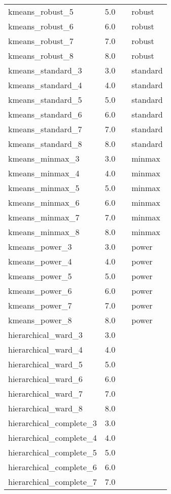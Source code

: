 \begin{tabular}{llll}
kmeans\_robust\_5 & 5.0 &  & robust \\ 
kmeans\_robust\_6 & 6.0 &  & robust \\ 
kmeans\_robust\_7 & 7.0 &  & robust \\ 
kmeans\_robust\_8 & 8.0 &  & robust \\ 
kmeans\_standard\_3 & 3.0 &  & standard \\ 
kmeans\_standard\_4 & 4.0 &  & standard \\ 
kmeans\_standard\_5 & 5.0 &  & standard \\ 
kmeans\_standard\_6 & 6.0 &  & standard \\ 
kmeans\_standard\_7 & 7.0 &  & standard \\ 
kmeans\_standard\_8 & 8.0 &  & standard \\ 
kmeans\_minmax\_3 & 3.0 &  & minmax \\ 
kmeans\_minmax\_4 & 4.0 &  & minmax \\ 
kmeans\_minmax\_5 & 5.0 &  & minmax \\ 
kmeans\_minmax\_6 & 6.0 &  & minmax \\ 
kmeans\_minmax\_7 & 7.0 &  & minmax \\ 
kmeans\_minmax\_8 & 8.0 &  & minmax \\ 
kmeans\_power\_3 & 3.0 &  & power \\ 
kmeans\_power\_4 & 4.0 &  & power \\ 
kmeans\_power\_5 & 5.0 &  & power \\ 
kmeans\_power\_6 & 6.0 &  & power \\ 
kmeans\_power\_7 & 7.0 &  & power \\ 
kmeans\_power\_8 & 8.0 &  & power \\ 
hierarchical\_ward\_3 & 3.0 &  &  \\ 
hierarchical\_ward\_4 & 4.0 &  &  \\ 
hierarchical\_ward\_5 & 5.0 &  &  \\ 
hierarchical\_ward\_6 & 6.0 &  &  \\ 
hierarchical\_ward\_7 & 7.0 &  &  \\ 
hierarchical\_ward\_8 & 8.0 &  &  \\ 
hierarchical\_complete\_3 & 3.0 &  &  \\ 
hierarchical\_complete\_4 & 4.0 &  &  \\ 
hierarchical\_complete\_5 & 5.0 &  &  \\ 
hierarchical\_complete\_6 & 6.0 &  &  \\ 
hierarchical\_complete\_7 & 7.0 &  &  \\ 

\end{tabular}
